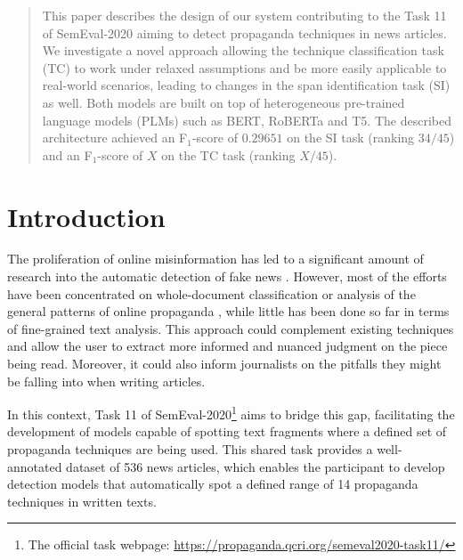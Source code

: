 \documentclass[11pt]{article}
\newcommand{\pol}[1]{{\fontfamily{pcr}\selectfont#1}}
\begin{document}
\maketitle
\begin{abstract}
This paper describes the design of our system contributing to the Task 11 of SemEval-2020 \cite{semeval} aiming to detect propaganda techniques in news articles.
We investigate a novel approach allowing the technique classification task (\pol{TC}) to work under relaxed assumptions and be more easily applicable to real-world scenarios, leading to changes in the span identification task (\pol{SI}) as well.
Both models are built on top of heterogeneous pre-trained language models (\pol{PLMs}) such as \pol{BERT}, \pol{RoBERTa} and \pol{T5}.
The described architecture achieved an F$_1$-score of $0.29651$ on the \pol{SI} task (ranking $34/45$) and an F$_1$-score of $X$ on the \pol{TC} task (ranking $X/45$).
\end{abstract}

\section{Introduction}
The proliferation of online misinformation has led to a significant amount of research into the automatic detection of fake news \cite{fakenews}. However, most of the efforts have been concentrated on whole-document classification \cite{rashkin-etal-2017-truth} or analysis of the general patterns of online propaganda \cite{garimella2015, chatfield2015}, while little has been done so far in terms of fine-grained text analysis. This approach could complement existing techniques and allow the user to extract more informed and nuanced judgment on the piece being read. Moreover, it could also inform journalists on the pitfalls they might be falling into when writing articles.

In this context, Task 11 of SemEval-2020\footnote{The official task webpage: \url{https://propaganda.qcri.org/semeval2020-task11/}} \cite{semeval} aims to bridge this gap, facilitating the development of models capable of spotting text fragments where a defined set of propaganda techniques are being used. This shared task provides a well-annotated dataset of 536 news articles, which enables the participant to develop detection models that automatically spot a defined range of 14 propaganda techniques in written texts.
\end{document}
